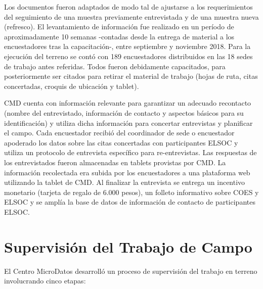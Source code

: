 \documentclass[
  openany]{book}
\begin{document}
Los documentos fueron adaptados de modo tal de ajustarse a los requerimientos del seguimiento de una muestra previamente entrevistada y de una muestra nueva (refresco). El levantamiento de información fue realizado en un período de aproximadamente 10 semanas -contadas desde la entrega de material a los encuestadores tras la capacitación-, entre septiembre y noviembre 2018. Para la ejecución del terreno se contó con 189 encuestadores distribuidos en las 18 sedes de trabajo antes referidas. Todos fueron debidamente capacitados, para posteriormente ser citados para retirar el material de trabajo (hojas de ruta, citas concertadas, croquis de ubicación y tablet).

CMD cuenta con información relevante para garantizar un adecuado recontacto (nombre del entrevistado, información de contacto y aspectos básicos para su identificación) y utiliza dicha información para concertar entrevistas y planificar el campo. Cada encuestador recibió del coordinador de sede o encuestador apoderado los datos sobre las citas concertadas con participantes ELSOC y utiliza un protocolo de entrevista específico para re-entrevistas. Las respuestas de los entrevistados fueron almacenadas en tablets provistas por CMD. La información recolectada era subida por los encuestadores a una plataforma web utilizando la tablet de CMD. Al finalizar la entrevista se entrega un incentivo monetario (tarjeta de regalo de 6.000 pesos), un folleto informativo sobre COES y ELSOC y se amplía la base de datos de información de contacto de participantes ELSOC.

\hypertarget{supervisiuxf3n-del-trabajo-de-campo}{%
\section{Supervisión del Trabajo de Campo}\label{supervisiuxf3n-del-trabajo-de-campo}}

El Centro MicroDatos desarrolló un proceso de supervisión del trabajo en terreno involucrando cinco etapas:
\end{document}
